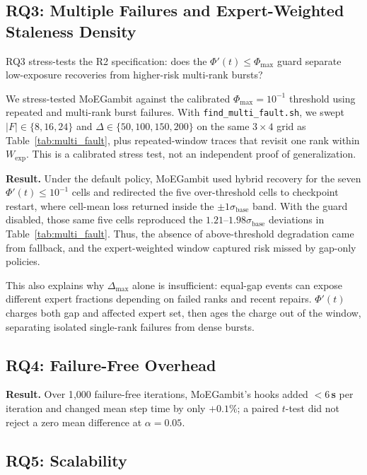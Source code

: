 \documentclass[10pt,conference]{IEEEtran}
\begin{document}
\subsection{RQ3: Multiple Failures and Expert-Weighted Staleness Density}
\label{sec:rq3}

RQ3 stress-tests the R2 specification: does the $\Phi'(t)\!\leq\!\Phi_{\max}$ guard separate low-exposure recoveries from higher-risk multi-rank bursts?

We stress-tested MoEGambit against the calibrated $\Phi_{\max}=10^{-1}$ threshold using repeated and multi-rank burst failures. With \texttt{find\_multi\_fault.sh}, we swept $|F|\!\in\!\{8,16,24\}$ and $\Delta\!\in\!\{50,100,150,200\}$ on the same $3\!\times\!4$ grid as Table~\ref{tab:multi_fault}, plus repeated-window traces that revisit one rank within $W_{\mathrm{exp}}$. This is a calibrated stress test, not an independent proof of generalization.

\textbf{Result.} Under the default policy, MoEGambit used hybrid recovery for the seven $\Phi'(t)\!\leq\!10^{-1}$ cells and redirected the five over-threshold cells to checkpoint restart, where cell-mean loss returned inside the $\pm 1\sigma_{\text{base}}$ band. With the guard disabled, those same five cells reproduced the $1.21$--$1.98\sigma_{\text{base}}$ deviations in Table~\ref{tab:multi_fault}. Thus, the absence of above-threshold degradation came from fallback, and the expert-weighted window captured risk missed by gap-only policies.

This also explains why $\Delta_{\max}$ alone is insufficient: equal-gap events can expose different expert fractions depending on failed ranks and recent repairs. $\Phi'(t)$ charges both gap and affected expert set, then ages the charge out of the window, separating isolated single-rank failures from dense bursts.

\subsection{RQ4: Failure-Free Overhead}
\label{sec:rq4}

\textbf{Result.} Over 1{,}000 failure-free iterations, MoEGambit's hooks added \textbf{$<6$\,\textmu s} per iteration and changed mean step time by only \textbf{$+0.1\%$}; a paired $t$-test did not reject a zero mean difference at $\alpha=0.05$.

\subsection{RQ5: Scalability}\label{sec:rq5}
\end{document}
